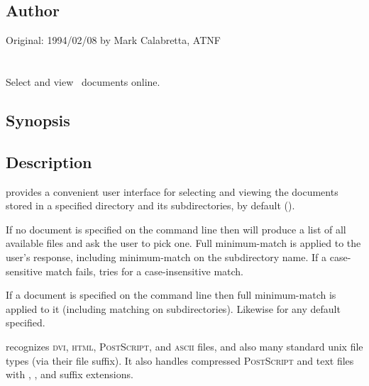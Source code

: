 \subsection*{Author}

Original: 1994/02/08 by Mark Calabretta, ATNF


\newpage
\section{}
\label{dox}



Select and view \aipspp\ documents online.

\subsection*{Synopsis}

\begin{synopsis}
\end{synopsis}

\subsection*{Description}

 provides a convenient user interface for selecting and viewing the
documents stored in a specified directory and its subdirectories,
 by default ().

If no document is specified on the command line then  will produce a
list of all available files and ask the user to pick one.  Full minimum-match
is applied to the user's response, including minimum-match on the subdirectory
name.  If a case-sensitive match fails,  tries for a case-insensitive
match.

If a document is specified on the command line then full minimum-match is
applied to it (including matching on subdirectories).  Likewise for any
default specified.

 recognizes \textsc{dvi}, \textsc{html}, \textsc{PostScript}, and
\textsc{ascii} files, and also many standard unix file types (via their file
suffix).  It also handles compressed \textsc{PostScript} and text files with
, , and  suffix extensions.

